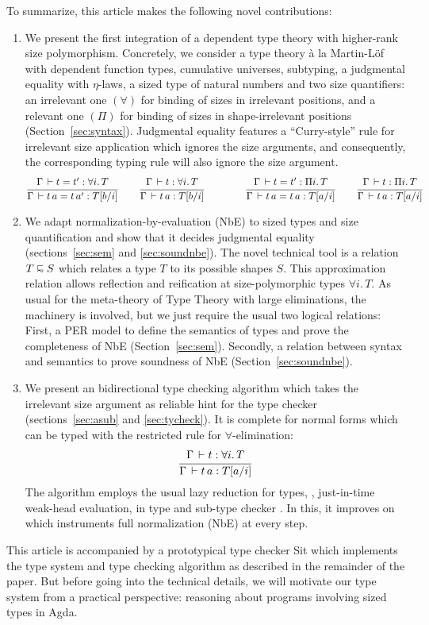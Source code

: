 \documentclass[acmlarge,review,anonymous]{acmart}\settopmatter{printfolios=true}
\begin{document}
To summarize, this article makes the following novel contributions:
\begin{enumerate}

\item We present the first integration of a dependent type theory with higher-rank size polymorphism.
Concretely, we consider a type theory \`a la Martin-L\"of with dependent function types, cumulative universes, subtyping, a judgmental equality with $\eta$-laws, a sized type of natural numbers and two size quantifiers: an irrelevant one $(\forall)$ for binding of sizes in irrelevant positions, and a relevant one $(\Pi)$ for binding of sizes in shape-irrelevant positions (Section~\ref{sec:syntax}).  Judgmental equality features a ``Curry-style'' rule for irrelevant size application which ignores the size arguments, and consequently, the corresponding typing rule will also ignore the size argument.
\[
\ru{\Gamma \der t = t' : \forall i.\, T
  }{\Gamma \der t\,a = t\,a' : T[b/i]}
\qquad
\ru{\Gamma \der t : \forall i.\, T
  }{\Gamma \der t\,a : T[b/i]}
\qquad
\qquad
\ru{\Gamma \der t = t' : \Pi i.\, T
  }{\Gamma \der t\,a = t\,a : T[a/i]}
\qquad
\ru{\Gamma \der t : \Pi i.\, T
  }{\Gamma \der t\,a : T[a/i]}
\]

\item We adapt normalization-by-evaluation (NbE) to sized types and size quantification and show that it decides judgmental equality (sections~\ref{sec:sem} and \ref{sec:soundnbe}).  The novel technical tool is a relation $T \shape S$ which relates a type $T$ to its possible shapes $S$.  This approximation relation allows reflection and reification at size-polymorphic types $\forall i.\, T$.
As usual for the meta-theory of Type Theory with large eliminations, the machinery is involved, but we just require the usual two logical relations:  First, a PER model to define the semantics of types and prove the completeness of NbE (Section~\ref{sec:sem}).  Secondly, a relation between syntax and semantics to prove soundness of NbE (Section~\ref{sec:soundnbe}).

\item We present an bidirectional type checking algorithm \cite{coquand:type} which takes the irrelevant size argument as reliable hint for the type checker (sections~\ref{sec:asub} and \ref{sec:tycheck}).  It is complete for normal forms which can be typed with the restricted rule for $\forall$-elimination:
\[
\ru{\Gamma \der t : \forall i.\, T
  }{\Gamma \der t\,a : T[a/i]}
\]
The algorithm employs the usual lazy reduction for types, \ie, just-in-time weak-head evaluation, in type and sub-type checker
\cite{huet:wsscs89}.  In this, it improves on \citet{fridlenderPagano:tlca13} which instruments full normalization (NbE) at every step.
\end{enumerate}
This article is accompanied by a prototypical type checker \textsf{Sit} which implements the type system and type checking algorithm as described in the remainder of the paper.
But before going into the technical details, we will motivate our type system from a practical perspective: reasoning about programs involving sized types in Agda.
\end{document}
